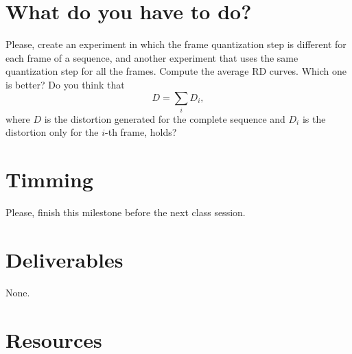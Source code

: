 \section{What do you have to do?}

Please, create an experiment in which the frame quantization step is
different for each frame of a sequence, and another experiment that
uses the same quantization step for all the frames. Compute the
average RD curves. Which one is better? Do you think that
\begin{equation*}
  D = \sum_i D_i,
\end{equation*}
where $D$ is the distortion generated for the complete sequence and
$D_i$ is the distortion only for the $i$-th frame, holds?


\section{Timming}

Please, finish this milestone before the next class session.

\section{Deliverables}

None.

\section{Resources}

\renewcommand{\addcontentsline}[3]{}%


